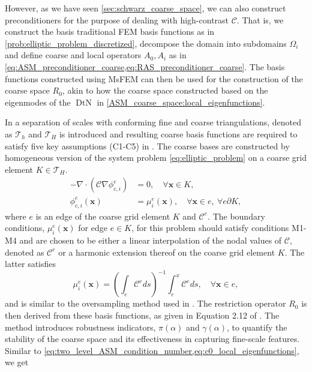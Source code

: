 However, as we have seen \cref{sec:schwarz_coarse_space}, we can also construct preconditioners for the purpose of dealing with high-contrast $\mathcal{C}$. That is, we construct the basis traditional FEM basis functions as in \cref{prob:elliptic_problem_discretized}, decompose the domain into subdomains $\Omega_i$ and define coarse and local operators $A_0, A_i$ as in \cref{eq:ASM_preconditioner_coarse,eq:RAS_preconditioner_coarse}. The basis functions constructed using MsFEM can then be used for the construction of the coarse space $R_0$, akin to how the coarse space constructed based on the eigenmodes of the $\operatorname{DtN}$ in \cref{ASM_coarse_space:local_eigenfunctions}. 

In \cite{msfem_coarse_space_Graham_2007,msfem_for_darcy_Efendiev2011} a separation of scales with conforming fine and coarse triangulations, denoted as $\mathcal{T}_h$ and $\mathcal{T}_H$ is introduced and resulting coarse basis functions are required to satisfy five key assumptions (C1-C5) in \cite[Section 2.2]{msfem_coarse_space_Graham_2007}. The coarse bases are constructed by homogeneous version of the system problem \cref{eq:elliptic_problem} on a coarse grid element $K\in\mathcal{T}_H$.
\begin{equation}
    \begin{aligned}
        -\nabla\cdot(\mathcal{C} \nabla \phi^e_{c,i}) &= 0, \quad \forall \mathbf{x} \in K,\\
        \phi^e_{c,i}(\mathbf{x}) &= \mu^e_i(\mathbf{x}), \quad \forall \mathbf{x} \in e, \ \forall e \partial K,
    \end{aligned}
    \label{eq:msfem_coarse_basis}
\end{equation}
where $e$ is an edge of the coarse grid element $K$ and $\mathcal{C}^e$. The boundary conditions, $\mu^e_i(\mathbf{x})$ for edge $e\in K$, for this problem should satisfy conditions M1-M4 \cite[Section 4]{msfem_coarse_space_Graham_2007} and are chosen to be either a linear interpolation of the nodal values of $\mathcal{C}$, denoted as $\mathcal{C}^e$ or a harmonic extension thereof on the coarse grid element $K$. The latter satisfies
\begin{equation}
    \mu^e_i(\mathbf{x}) = \left(\int_e \mathcal{C}^e ds\right)^{-1}\int_e^x \mathcal{C}^e ds, \quad \forall \mathbf{x} \in e,
    \label{eq:msfem_harmonic_extension}
\end{equation}
and is similar to the oversampling method used in \cite{og_msfem_Hou1997}. The restriction operator $R_0$ is then derived from these basis functions, as given in Equation 2.12 of \cite{msfem_coarse_space_Graham_2007}. The method introduces robustness indicators, $\pi(\alpha)$ and $\gamma(\alpha)$, to quantify the stability of the coarse space and its effectiveness in capturing fine-scale features. Similar to \cref{eq:two_level_ASM_condition_number,eq:c0_local_eigenfunctions}, we get \cite[Theorem 3.9]{msfem_coarse_space_Graham_2007}
